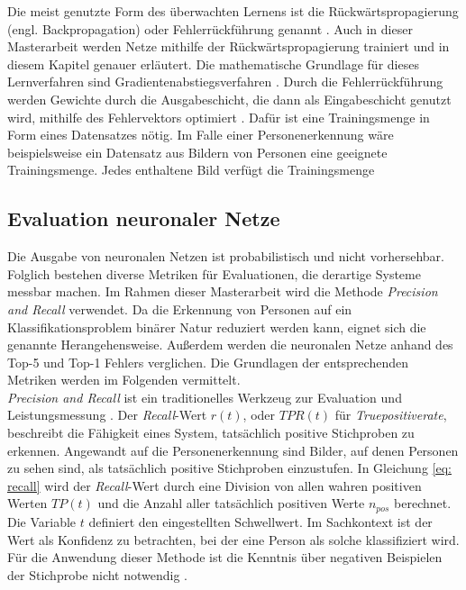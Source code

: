 		Die meist genutzte Form des überwachten Lernens ist die Rückwärtspropagierung (engl. Backpropagation) oder Fehlerrückführung genannt \cite{Ertel}. Auch in dieser Masterarbeit werden Netze mithilfe der Rückwärtspropagierung trainiert und in diesem Kapitel genauer erläutert. Die mathematische Grundlage für dieses Lernverfahren sind Gradientenabstiegsverfahren \cite{Kriesel}. Durch die Fehlerrückführung werden Gewichte durch die Ausgabeschicht, die dann als Eingabeschicht genutzt wird, mithilfe des Fehlervektors optimiert \cite{Kriesel}. Dafür ist eine Trainingsmenge in Form eines Datensatzes nötig. Im Falle einer Personenerkennung wäre beispielsweise ein Datensatz aus Bildern von Personen eine geeignete Trainingsmenge. Jedes enthaltene Bild verfügt die Trainingsmenge\\
		
	
		
		\subsection{Evaluation neuronaler Netze}
		Die Ausgabe von neuronalen Netzen ist probabilistisch und nicht vorhersehbar. Folglich bestehen diverse Metriken für Evaluationen, die derartige Systeme messbar machen. Im Rahmen dieser Masterarbeit wird die Methode \textit{Precision and Recall} verwendet. Da die Erkennung von Personen auf ein Klassifikationsproblem binärer Natur reduziert werden kann, eignet sich die genannte Herangehensweise. Außerdem werden die neuronalen Netze anhand des Top-5 und Top-1 Fehlers verglichen. Die Grundlagen der entsprechenden Metriken werden im Folgenden vermittelt.\\
		
		\textit{Precision and Recall} ist ein traditionelles Werkzeug zur Evaluation und Leistungsmessung \cite{precisionandrecall}. Der \textit{Recall}-Wert $r(t)$, oder $TPR(t)$ für \textit{Truepositiverate}, beschreibt die Fähigkeit eines System, tatsächlich positive Stichproben zu erkennen. Angewandt auf die Personenerkennung sind Bilder, auf denen Personen zu sehen sind, als tatsächlich positive Stichproben einzustufen. In Gleichung \ref{eq: recall} wird der \textit{Recall}-Wert durch eine Division von allen wahren positiven Werten $TP(t)$ und die Anzahl aller tatsächlich positiven Werte $n_{pos}$ berechnet. Die Variable $t$ definiert den eingestellten Schwellwert. Im Sachkontext ist der Wert als Konfidenz zu betrachten, bei der eine Person als solche klassifiziert wird. Für die Anwendung dieser Methode ist die Kenntnis über negativen Beispielen der Stichprobe nicht notwendig \cite{bildundobjekt}.\\ 
		
